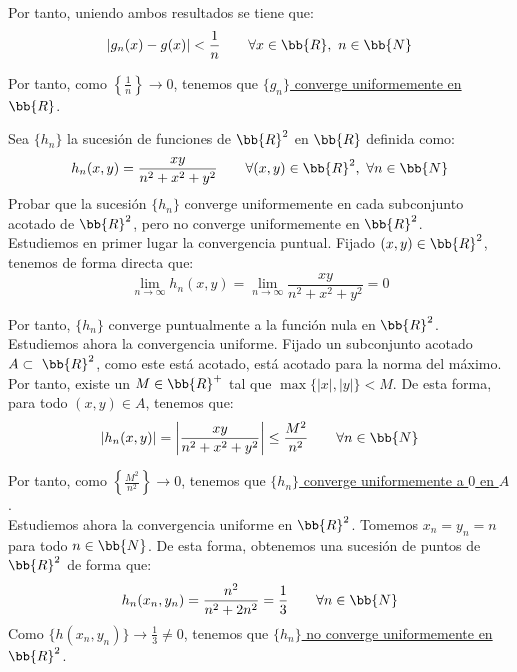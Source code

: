 \begin{ejercicio}
    Por tanto, uniendo ambos resultados se tiene que:
    \begin{equation*}
        |g_n(x)-g(x)|<\frac{1}{n} \qquad \forall x\in \bb{R},~n\in \bb{N}
    \end{equation*}

    Por tanto, como $\left\{\frac{1}{n}\right\}\to 0$, tenemos que \ul{$\{g_n\}$ converge uniformemente en $\bb{R}$}.
\end{ejercicio}



\begin{ejercicio}
    Sea $\{h_n\}$ la sucesión de funciones de $\bb{R}^2$ en $\bb{R}$ definida como:
    \begin{equation*}
        h_n(x,y) = \frac{xy}{n^2+x^2+y^2} \qquad \forall (x,y)\in \bb{R}^2,~\forall n\in \bb{N}
    \end{equation*}
    Probar que la sucesión $\{h_n\}$ converge uniformemente en cada subconjunto acotado de $\bb{R}^2$,
    pero no converge uniformemente en $\bb{R}^2$.\\

    Estudiemos en primer lugar la convergencia puntual. Fijado $(x,y)\in \bb{R}^2$, tenemos de forma directa que:
    \begin{equation*}
        \lim_{n\to \infty} h_n(x,y) = \lim_{n\to \infty} \frac{xy}{n^2+x^2+y^2}=0
    \end{equation*}

    Por tanto, $\{h_n\}$ converge puntualmente a la función nula en $\bb{R}^2$.\\

    Estudiemos ahora la convergencia uniforme. Fijado un subconjunto acotado $A\subset~\bb{R}^2$, como este está acotado, está acotado para la norma del máximo. Por tanto, existe un $M\in \bb{R}^+$ tal que $\max\{|x|,|y|\}<M$. De esta forma, para todo $(x,y)\in A$, tenemos que:
    \begin{equation*}
        |h_n(x,y)| = \left|\frac{xy}{n^2+x^2+y^2}\right| \leq \frac{M^2}{n^2} \qquad \forall n\in \bb{N}
    \end{equation*}

    Por tanto, como $\left\{\frac{M^2}{n^2}\right\}\to 0$, tenemos que \ul{$\{h_n\}$ converge uniformemente a $0$ en $A$}.\\

    Estudiemos ahora la convergencia uniforme en $\bb{R}^2$. Tomemos $x_n=y_n=n$ para todo $n\in \bb{N}$. De esta forma, obtenemos una sucesión de puntos de $\bb{R}^2$ de forma que:
    \begin{equation*}
        h_n(x_n,y_n) = \frac{n^2}{n^2+2n^2} = \frac{1}{3} \qquad \forall n\in \bb{N}
    \end{equation*}
    Como $\{h(x_n,y_n)\}\to \frac{1}{3}\neq 0$, tenemos que \ul{$\{h_n\}$ no converge uniformemente en $\bb{R}^2$}.
\end{ejercicio}


